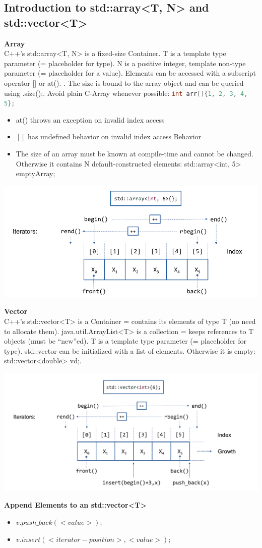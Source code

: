 \subsection{Introduction to std::array<T, N> and std::vector<T>}
\textbf{Array}\\
C++'s std::array<T, N> is a fixed-size Container.  T is a template type parameter (= placeholder for type). N is a positive integer, template non-type parameter (= placeholder for a value). Elements can be accessed with a subscript operator [] or at(). . The size is bound to the array object and can be queried using .size();. Avoid plain C-Array whenever possible: \lstinline[language=C++]|int arr[]{1, 2, 3, 4, 5};|
\begin{itemize}
  \itemsep -0.5em 
  \item at() throws an exception on invalid index access
  \item $[]$ has undefined behavior on invalid index access Behavior
  \item The size of an array must be known at compile-time and cannot be changed. Otherwise it contains N default-constructed elements: std::array<int, 5> emptyArray{};
\end{itemize}
\begin{center}
\includegraphics[width=0.75\linewidth]{images/array}
\end{center}

\textbf{Vector}\\
C++'s std::vector<T> is a Container = contains its elements of type T (no need to allocate them). java.util.ArrayList<T> is a collection = keeps references to T objects (must be “new”ed).  T is a template type parameter (= placeholder for type). std::vector can be initialized with a list of elements. Otherwise it is empty: std::vector<double> vd{};.
\begin{center}
\includegraphics[width=0.75\linewidth]{images/vector}
\end{center}
\textbf{Append Elements to an std::vector<T>}
\begin{itemize}
  \itemsep -0.5em 
  \item $v.push\_back(<value>);$
  \item $v.insert (<iterator-position>, <value>);$
\end{itemize}

